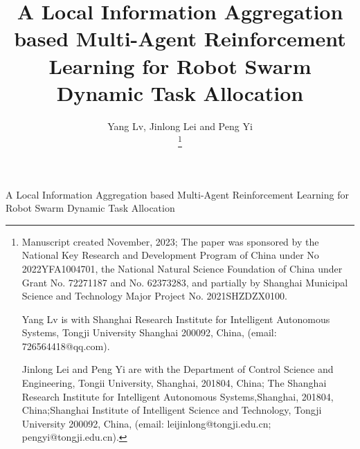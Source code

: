 \documentclass[lettersize,journal]{IEEEtran}
\begin{document}
\title{A Local Information Aggregation based Multi-Agent Reinforcement Learning for Robot Swarm Dynamic Task Allocation}

\author{Yang Lv, Jinlong Lei and Peng Yi

\thanks{Manuscript created November, 2023; The paper was sponsored by the National Key Research and Development Program of China under No 2022YFA1004701,  the National Natural Science Foundation of China under Grant  No. 72271187 and No. 62373283, and partially by Shanghai Municipal Science and Technology Major Project No. 2021SHZDZX0100. 

Yang Lv is with Shanghai Research Institute for  Intelligent Autonomous Systems,  Tongji University Shanghai 200092, China, (email: 726564418@qq.com).

Jinlong Lei and Peng Yi are with the Department of Control Science and Engineering, Tongii University, Shanghai, 201804, China; The Shanghai Research Institute for Intelligent Autonomous Systems,Shanghai, 201804, China;Shanghai Institute of Intelligent Science and Technology, Tongji University 200092, China, (email: leijinlong@tongji.edu.cn; pengyi@tongji.edu.cn).}
}

%
{A Local Information Aggregation based Multi-Agent Reinforcement Learning for Robot Swarm Dynamic Task Allocation}

\maketitle
\end{document}
